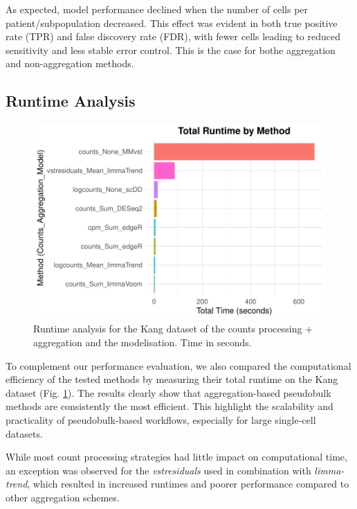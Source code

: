 \documentclass[a4paper, 11pt, twocolumn]{article}
\begin{document}
\begin{multicols}{2}
As expected, model performance declined when the number of cells per patient/subpopulation decreased. This effect was evident in both true positive rate (TPR) and false discovery rate (FDR), with fewer cells leading to reduced sensitivity and less stable error control. This is the case for bothe aggregation and non-aggregation methods.
	
\subsection{Runtime Analysis}

\begin{figure}[H]
	\centering
	\includegraphics[width=1\columnwidth]{figs/plot_runtime_Kang.pdf}
	\caption{{\footnotesize Runtime analysis for the Kang dataset of the counts processing + aggregation and the modelisation. Time in seconds.}}
	\label{fig:runtime}
\end{figure}

To complement our performance evaluation, we also compared the computational efficiency of the tested methods by measuring their total runtime on the Kang dataset (Fig. \ref{fig:runtime}). The results clearly show that aggregation-based pseudobulk methods are consistently the most efficient. This highlight the scalability and practicality of pseudobulk-based workflows, especially for large single-cell datasets.

While most count processing strategies had little impact on computational time, an exception was observed for the \textit{vstresiduals} used in combination with \textit{limma-trend}, which resulted in increased runtimes and poorer performance compared to other aggregation schemes. 


\end{multicols}
\end{document}
